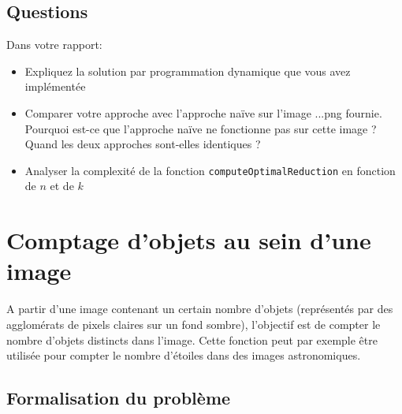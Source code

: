 \documentclass[a4paper,10pt]{article}
\begin{document}
\subsection*{Questions}

Dans votre rapport:
\begin{itemize}
\item Expliquez la solution par programmation dynamique que vous avez implémentée
\item Comparer votre approche avec l'approche naïve sur l'image ...png fournie. Pourquoi est-ce que l'approche naïve ne fonctionne pas sur cette image ? Quand les deux approches sont-elles identiques ?
\item Analyser la complexité de la fonction \texttt{computeOptimalReduction} en fonction de $n$ et de $k$
\end{itemize}

\section{Comptage d'objets au sein d'une image}

A partir d'une image contenant un certain nombre d'objets (représentés par des agglomérats de pixels claires sur un fond sombre), l'objectif est de compter le nombre d'objets
distincts dans l'image. Cette fonction peut par exemple être utilisée
pour compter le nombre d'étoiles dans des images astronomiques.

\subsection*{Formalisation du problème}
\end{document}
